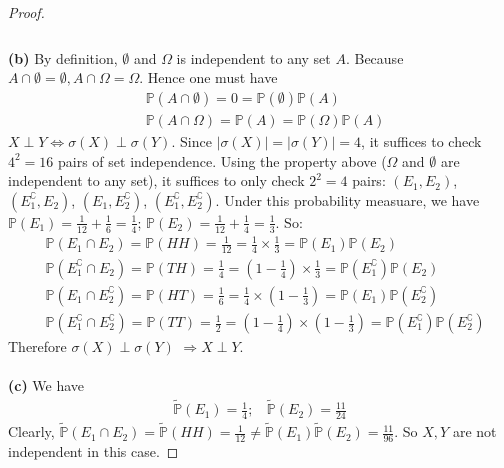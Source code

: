 \documentclass[a4paper, 10pt]{article}
\theoremstyle{definition}
\theoremstyle{hSol}
\begin{document}
\begin{proof}
\begin{equation}
\begin{split}
	\end{split}
\end{equation}
~\\
\textbf{(b)} By definition, $\emptyset$ and $\Omega$ is independent to any set $A$. Because $A\cap \emptyset = \emptyset, A\cap \Omega= \Omega$. Hence one must have
\begin{equation}
	\begin{split}
		&\mathbb{P}\left(A\cap \emptyset\right) = 0 = \mathbb{P}\left(\emptyset\right)\mathbb{P}\left(A\right) \\
		&\mathbb{P}\left(A\cap \Omega \right) = \mathbb{P}\left(A\right)  = \mathbb{P}\left(\Omega\right)\mathbb{P}\left(A\right)
	\end{split}
\end{equation}
$X\perp Y \iff \sigma(X)\perp \sigma(Y)$. Since $|\sigma(X)|=|\sigma(Y)|=4$, it suffices to check $4^2 =16 $ pairs of set independence. Using the property above ($\Omega$ and $\emptyset$ are independent to any set), it suffices to only check $2^2=4$ pairs: $(E_1, E_2)$, $(E_1^{\complement}, E_2)$, $(E_1, E_2^{\complement})$, $(E_1^{\complement}, E_2^{\complement})$. Under this probability measuare, we have $\mathbb{P}\left(E_1\right) = \frac{1}{12}+\frac{1}{6} = \frac{1}{4}$; $\mathbb{P}\left(E_2\right) = \frac{1}{12}+\frac{1}{4} = \frac{1}{3}$. So:
\begin{equation}
	\begin{split}
		&\mathbb{P}\left(E_1 \cap E_2\right) = \mathbb{P}\left(HH\right) = \frac{1}{12} = \frac{1}{4}\times \frac{1}{3} = \mathbb{P}\left(E_1\right)\mathbb{P}\left(E_2\right)\\
		&\mathbb{P}\left(E_1^{\complement} \cap E_2\right) = \mathbb{P}\left(TH\right) = \frac{1}{4} = \left(1-\frac{1}{4}\right)\times \frac{1}{3} = \mathbb{P}\left(E_1^{\complement}\right)\mathbb{P}\left(E_2\right)\\
		&\mathbb{P}\left(E_1 \cap E_2^{\complement}\right) = \mathbb{P}\left(HT\right) = \frac{1}{6} = \frac{1}{4}\times\left(1- \frac{1}{3}\right) = \mathbb{P}\left(E_1\right)\mathbb{P}\left(E_2^{\complement}\right)\\
		&\mathbb{P}\left(E_1^{\complement} \cap E_2^{\complement}\right) = \mathbb{P}\left(TT\right) = \frac{1}{2} = \left(1-\frac{1}{4}\right)\times \left(1-\frac{1}{3}\right) = \mathbb{P}\left(E_1^{\complement}\right)\mathbb{P}\left(E_2^{\complement}\right)
	\end{split}
\end{equation}
Therefore $\sigma(X)\perp \sigma(Y)$ $\Rightarrow X\perp Y$.\\
~\\
\textbf{(c)} We have
\begin{equation}
	\begin{split}
		\tilde{\mathbb{P}}\left(E_1\right) = \frac{1}{4};~~~~\tilde{\mathbb{P}}\left(E_2\right)=\frac{11}{24}
	\end{split}
\end{equation}
Clearly, $\tilde{\mathbb{P}}\left(E_1 \cap E_2\right) = \tilde{\mathbb{P}}\left(HH\right) = \frac{1}{12}\ne \tilde{\mathbb{P}}\left(E_1\right)\tilde{\mathbb{P}}\left(E_2\right) = \frac{11}{96}$. So $X,Y$ are not independent in this case.


\end{proof}
\end{document}
